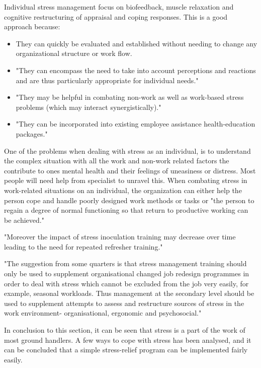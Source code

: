 Individual stress management focus on biofeedback, muscle relaxation and cognitive restructuring of appraisal and coping responses. This is a good approach because:

\begin{itemize}
\item They can quickly be evaluated and established without needing to change any organizational structure or work flow.
\item "They can encompass the need to take into account perceptions and reactions and are thus particularly appropriate for individual needs."
\item "They may be helpful in combating non-work as well as work-based stress problems (which may interact synergistically)."
\item "They can be incorporated into existing employee assistance health-education packages."
\end{itemize}

One of the problems when dealing with stress as an individual, is to understand the complex situation with all the work and non-work related factors the contribute to ones mental health and their feelings of uneasiness or distress. Most people will need help from specialist to unravel this.
When combating stress in work-related situations on an individual, the organization can either help the person cope and handle poorly designed work methods or tasks or "the person to regain a degree of normal functioning so that return to productive working can be achieved."

"Moreover the impact of stress inoculation training may decrease over time leading to the need for repeated refresher training."

"The suggestion from some quarters is that stress management training should only be used to supplement organisational changed job redesign programmes in order to deal with stress which cannot be excluded from the job very easily, for example, seasonal workloads. Thus management at the secondary level should be used to supplement attempts to assess and restructure sources of stress in the work environment- organisational, ergonomic and psychosocial."

In conclusion to this section, it can be seen that stress is a part of the work of most ground handlers. A few ways to cope with stress has been analysed, and it can be concluded that a simple stress-relief program can be implemented fairly easily.